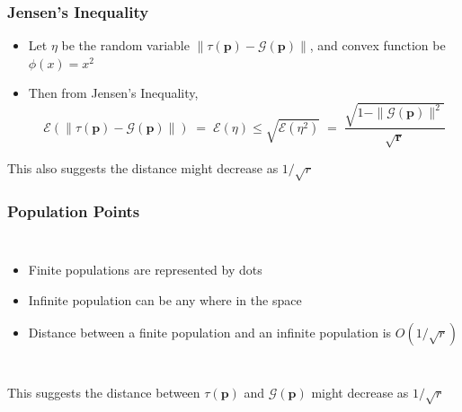 \documentclass[aspectratio=169]{beamer}
\begin{document}
  \begin{frame}
    \frametitle{Jensen's Inequality}
    \begin{itemize}
      \item{Let $\eta$ be the random variable $\| \tau (\bm{p}) - \mathcal{G}(\bm{p}) \|$, and convex function be $\phi (x) = x^2$}
      \item{Then from Jensen's Inequality, 
	\[
	  \mathcal{E}(\| \tau (\bm{p}) - \mathcal{G}(\bm{p}) \|) \;=\; \mathcal{E}(\eta) \leq \sqrt{\mathcal{E}(\eta^2)} \;=\; 
	  \frac{\sqrt{1 - \|\mathcal{G}(\bm{p})\|^2}}{\sqrt{\bm{r}}}
	\]
      }
    \end{itemize}
    This also suggests the distance might decrease as $1/\sqrt{r}$
  \end{frame}
  
  \begin{frame}
    \frametitle{Population Points }
    \begin{columns}
	\centering
	\begin{itemize}
	  \item{Finite populations are represented by dots}
	  \item{Infinite population can be any where in the space}
	  \item{Distance between a finite population and an infinite population is  $O(1/\sqrt{r})$}
	\end{itemize}
    \end{columns}
    This suggests the distance between $\tau(\bm{p})$ and $\mathcal{G}(\bm{p})$ might decrease as $1/\sqrt{r}$
  \end{frame}
  
\end{document}
